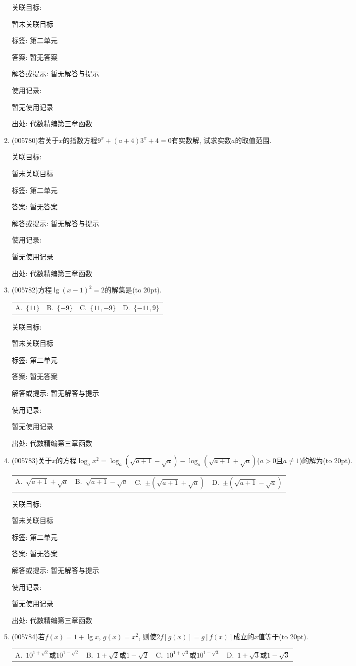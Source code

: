 \documentclass[10pt,a4paper]{article}
\newcommand{\bracket}[1]{(\hbox to #1pt{})}
\newcommand{\fourch}[4]{\par\begin{tabular}{p{.23\textwidth}p{.23\textwidth}p{.23\textwidth}p{.23\textwidth}}
A.~#1 &B.~#2& C.~#3& D.~#4
\end{tabular}}
\begin{document}
\begin{enumerate}[1.]
关联目标:

暂未关联目标



标签: 第二单元

答案: 暂无答案

解答或提示: 暂无解答与提示

使用记录:

暂无使用记录


出处: 代数精编第三章函数
\item { (005780)}若关于$x$的指数方程$9^x+(a+4)3^x+4=0$有实数解, 试求实数$a$的取值范围.


关联目标:

暂未关联目标



标签: 第二单元

答案: 暂无答案

解答或提示: 暂无解答与提示

使用记录:

暂无使用记录


出处: 代数精编第三章函数
\item { (005782)}方程$\lg (x-1)^2=2$的解集是\bracket{20}.
\fourch{$\{11\}$}{$\{-9\}$}{$\{11,-9\}$}{$\{-11,9\}$}


关联目标:

暂未关联目标



标签: 第二单元

答案: 暂无答案

解答或提示: 暂无解答与提示

使用记录:

暂无使用记录


出处: 代数精编第三章函数
\item { (005783)}关于$x$的方程$\log_ax^2=\log_a(\sqrt {a+1}-\sqrt a)-\log_a(\sqrt {a+1}+\sqrt a)$($a>0$且$a\ne 1$)的解为\bracket{20}.
\fourch{$\sqrt {a+1}+\sqrt a$}{$\sqrt {a+1}-\sqrt a$}{$\pm (\sqrt {a+1}+\sqrt a)$}{$\pm (\sqrt {a+1}-\sqrt a)$}


关联目标:

暂未关联目标



标签: 第二单元

答案: 暂无答案

解答或提示: 暂无解答与提示

使用记录:

暂无使用记录


出处: 代数精编第三章函数
\item { (005784)}若$f(x)=1+\lg x$, $g(x)=x^2$, 则使$2f[g(x)]=g[f(x)]$成立的$x$值等于\bracket{20}.
\fourch{$10^{1+\sqrt 2}$或$10^{1-\sqrt 2}$}{$1+\sqrt 2$或$1-\sqrt 2$}{$10^{1+\sqrt 3}$或$10^{1-\sqrt 3}$}{$1+\sqrt 3$或$1-\sqrt 3$}



\end{enumerate}
\end{document}
